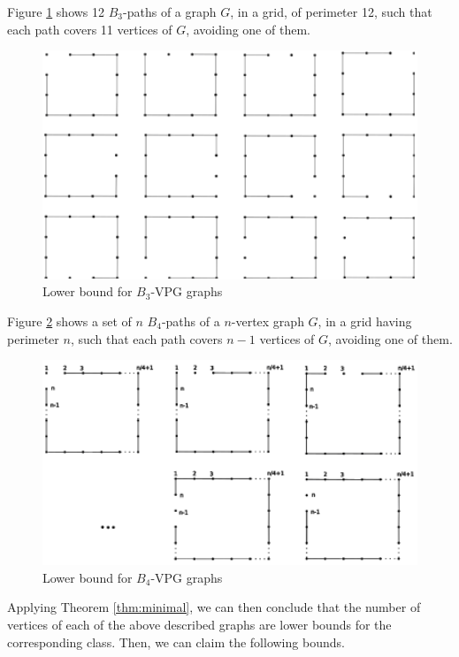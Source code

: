 Figure \ref{VPG:lower-B3} shows 12 $B_3$-paths of a graph $G$, in a grid, of perimeter 12, such that each path covers 11  vertices of $G$,  avoiding one of them. 

\begin{figure}[!h]
    \centering
    \includegraphics[width=12cm]{./img/lower-bound-B3-VPG.pdf}
    \caption{Lower bound for $B_3$-VPG graphs}
    \label{VPG:lower-B3}
\end{figure}

Figure \ref{VPG:lower-B4} shows a set of $n$ $B_4$-paths of a $n$-vertex graph $G$, in a grid having perimeter $n$,  such that each path covers $n-1$  vertices of $G$, avoiding one of them. 

\begin{figure}[!h]
    \centering
    \includegraphics[width=12cm]{./img/lower-bound-B4-VPG.pdf}
    \caption{Lower bound for $B_4$-VPG graphs}
    \label{VPG:lower-B4}
\end{figure}

Applying Theorem \ref{thm:minimal}, we can then conclude that the number of vertices of each of the above described graphs are lower bounds for the corresponding class. Then, we can claim the following bounds.

